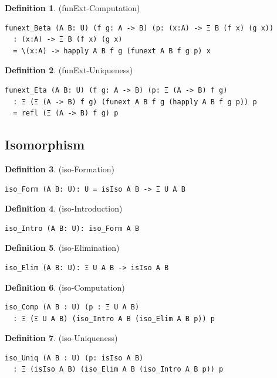 \documentclass{article}
\theoremstyle{definition}
\newtheorem{definition}{Definition}
\begin{document}
\begin{definition} (funExt-Computation)
\begin{lstlisting}
funext_Beta (A B: U) (f g: A -> B) (p: (x:A) -> Ξ B (f x) (g x))
  : (x:A) -> Ξ B (f x) (g x)
  = \(x:A) -> happly A B f g (funext A B f g p) x
\end{lstlisting}
\end{definition}

\begin{definition} (funExt-Uniqueness)
\begin{lstlisting}
funext_Eta (A B: U) (f g: A -> B) (p: Ξ (A -> B) f g)
  : Ξ (Ξ (A -> B) f g) (funext A B f g (happly A B f g p)) p
  = refl (Ξ (A -> B) f g) p
\end{lstlisting}
\end{definition}

\newpage
\subsection{Isomorphism}

\begin{definition} (iso-Formation)
\begin{lstlisting}
iso_Form (A B: U): U = isIso A B -> Ξ U A B
\end{lstlisting}
\end{definition}

\begin{definition} (iso-Introduction)
\begin{lstlisting}
iso_Intro (A B: U): iso_Form A B
\end{lstlisting}
\end{definition}

\begin{definition} (iso-Elimination)
\begin{lstlisting}
iso_Elim (A B: U): Ξ U A B -> isIso A B
\end{lstlisting}
\end{definition}

\begin{definition} (iso-Computation)
\begin{lstlisting}
iso_Comp (A B : U) (p : Ξ U A B)
  : Ξ (Ξ U A B) (iso_Intro A B (iso_Elim A B p)) p
\end{lstlisting}
\end{definition}

\begin{definition} (iso-Uniqueness)
\begin{lstlisting}
iso_Uniq (A B : U) (p: isIso A B)
  : Ξ (isIso A B) (iso_Elim A B (iso_Intro A B p)) p
\end{lstlisting}
\end{definition}
\end{document}
